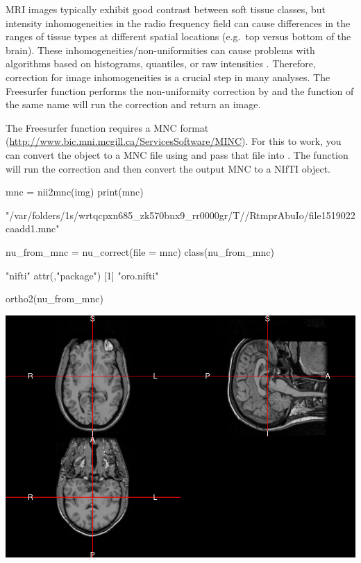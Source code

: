 MRI images typically exhibit good contrast between soft tissue classes,
but intensity inhomogeneities in the radio frequency field can cause
differences in the ranges of tissue types at different spatial locations
(e.g.~top versus bottom of the brain). These
inhomogeneities/non-uniformities can cause problems with algorithms
based on histograms, quantiles, or raw intensities
\citep{zhang_segmentation_2001}. Therefore, correction for image
inhomogeneities is a crucial step in many analyses. The Freesurfer
function  performs the non-uniformity correction by
\citet{sled_nonparametric_1998} and the  function of the
same name will run the correction and return an image.

The Freesurfer  function requires a MNC format
(\url{http://www.bic.mni.mcgill.ca/ServicesSoftware/MINC}). For this to
work, you can convert the  object to a MNC file using
 and pass that file into . The
  function will run the correction and
then convert the output MNC to a NIfTI object.

\begin{Schunk}
\begin{Sinput}
mnc = nii2mnc(img)
print(mnc)
\end{Sinput}
\begin{Soutput}
[1] "/var/folders/1s/wrtqcpxn685_zk570bnx9_rr0000gr/T//RtmprAbuIo/file1519022caadd1.mnc"
\end{Soutput}
\begin{Sinput}
nu_from_mnc = nu_correct(file = mnc)
class(nu_from_mnc)
\end{Sinput}
\begin{Soutput}
[1] "nifti"
attr(,"package")
[1] "oro.nifti"
\end{Soutput}
\begin{Sinput}
ortho2(nu_from_mnc)
\end{Sinput}

\includegraphics{Freesurfer_files/figure-latex/nu_correct_mcn2nii-1} \end{Schunk}

